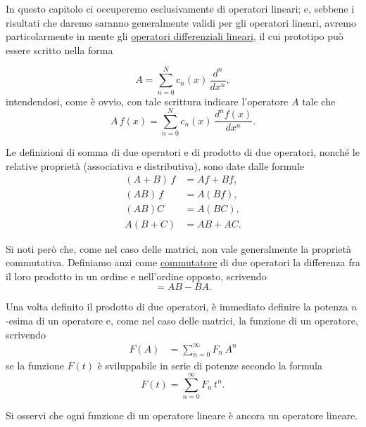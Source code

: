 \documentclass[11pt, a4paper]{book}
\numberwithin{equation}{section}
\begin{document}
In questo capitolo ci occuperemo esclusivamente di operatori lineari;
e, sebbene i risultati che daremo saranno generalmente validi per gli
operatori lineari, avremo particolarmente in mente gli
\underline{operatori differenziali lineari}, il cui prototipo può essere
scritto nella forma


\begin{equation}
A = \sum_{n=0}^{N} c_n(x)\,\frac{d^n}{dx^n},
\end{equation}
intendendosi, come è ovvio, con tale scrittura indicare l'operatore $A$
tale che
\begin{equation}
A\,f(x) = \sum_{n=0}^{N} c_n(x)\,\frac{d^n f(x)}{dx^n}.
\end{equation}

Le definizioni di somma di due operatori e di prodotto di due operatori,
nonché le relative proprietà (associativa e distributiva), sono date
dalle formule
\begin{align}
(A+B)\,f &= Af + Bf, \tag{6a} \\
(AB)\,f  &= A(Bf), \tag{6b} \\
(AB)C    &= A(BC), \tag{6c} \\
A(B+C)   &= AB + AC. \tag{6d}
\end{align}

Si noti però che, come nel caso delle matrici, non vale generalmente la
proprietà commutativa. Definiamo anzi come \underline{commutatore} di
due operatori la differenza fra il loro prodotto in un ordine e
nell'ordine opposto, scrivendo
\begin{equation}
[A,B] = AB - BA.
\end{equation}

Una volta definito il prodotto di due operatori, è immediato definire la
potenza $n$-esima di un operatore e, come nel caso delle matrici, la
funzione di un operatore, scrivendo
\begin{align}
F(A) &= \sum_{n=0}^{\infty} F_n\,A^n \tag{8a}
\end{align}
se la funzione $F(t)$ è sviluppabile in serie di potenze secondo la
formula
\begin{equation}
F(t) = \sum_{n=0}^{\infty} F_n\,t^n. \tag{8b}
\end{equation}


Si osservi che ogni funzione di un operatore lineare è ancora un
operatore lineare.
\end{document}
